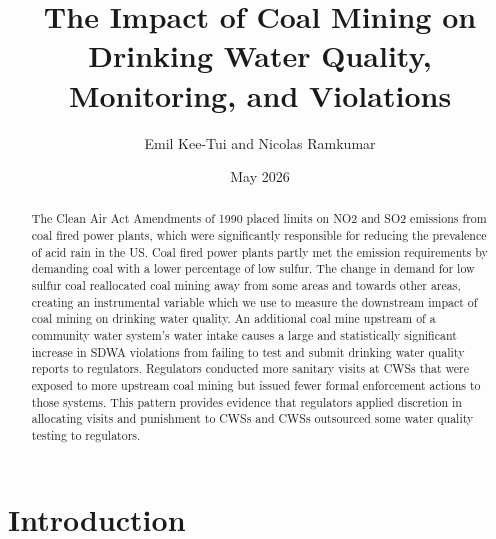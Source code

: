 \documentclass{article}
\begin{document}
\title{The Impact of Coal Mining on Drinking Water Quality, Monitoring, and Violations}
\author[1]{Emil Kee-Tui and Nicolas Ramkumar}
\date{May 2026}
\maketitle
\thispagestyle{empty}
\doublespacing

\begin{center}\begin{abstract}
		\noindent The Clean Air Act Amendments of 1990 placed limits on NO2 and SO2 emissions from coal fired power plants, which were significantly responsible for reducing the prevalence of acid rain in the US. Coal fired power plants partly met the emission requirements by demanding coal with a lower percentage of low sulfur. The change in demand for low sulfur coal reallocated coal mining away from some areas and towards other areas, creating an instrumental variable which we use to measure the downstream impact of coal mining on drinking water quality. An additional coal mine upstream of a community water system's water intake causes a large and statistically significant increase in SDWA violations from failing to test and submit drinking water quality reports to regulators. Regulators conducted more sanitary visits at CWSs that were exposed to more upstream coal mining but issued fewer formal enforcement actions to those systems. This pattern provides evidence that regulators applied discretion in allocating visits and punishment to CWSs and CWSs outsourced some water quality testing to regulators.

\end{abstract}\end{center}
	
\newpage
\doublespacing


\section{Introduction}
\end{document}

